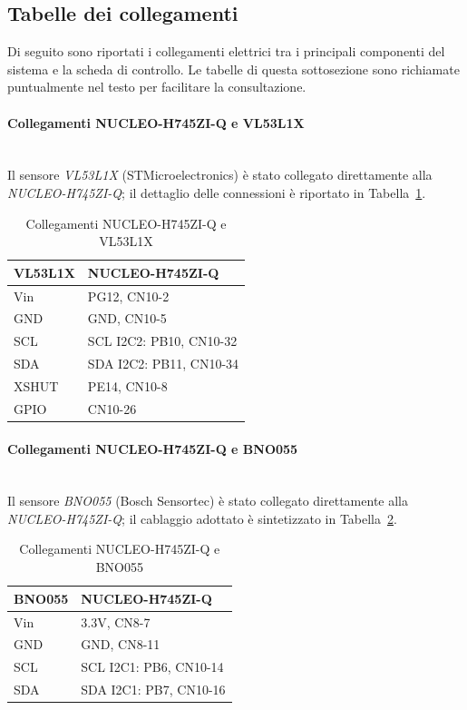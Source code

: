 \documentclass[11pt]{report}
\begin{document}
	\clearpage
	\subsection{Tabelle dei collegamenti}
	Di seguito sono riportati i collegamenti elettrici tra i principali componenti del sistema e la scheda di controllo. Le tabelle di questa sottosezione sono richiamate puntualmente nel testo per facilitare la consultazione.

	\paragraph{Collegamenti NUCLEO-H745ZI-Q e VL53L1X}\mbox{}\\
	Il sensore \textit{VL53L1X} (STMicroelectronics) è stato collegato direttamente alla \textit{NUCLEO-H745ZI-Q}; il dettaglio delle connessioni è riportato in Tabella~\ref{tab:collegamenti-vl53l1x}.
	\begin{table}[H]
		\centering
		\begin{tabular}{l l}
			\toprule
			\textbf{VL53L1X} & \textbf{NUCLEO-H745ZI-Q} \\
			\midrule
			Vin & PG12, CN10-2 \\
			GND & GND, CN10-5 \\
			SCL & SCL I2C2: PB10, CN10-32 \\
			SDA & SDA I2C2: PB11, CN10-34 \\
			XSHUT & PE14, CN10-8 \\
			GPIO & CN10-26 \\
			\bottomrule
		\end{tabular}
		\caption{Collegamenti NUCLEO-H745ZI-Q e VL53L1X}
		\label{tab:collegamenti-vl53l1x}
	\end{table}

	\paragraph{Collegamenti NUCLEO-H745ZI-Q e BNO055}\mbox{}\\
	Il sensore \textit{BNO055} (Bosch Sensortec) è stato collegato direttamente alla \textit{NUCLEO-H745ZI-Q}; il cablaggio adottato è sintetizzato in Tabella~\ref{tab:collegamenti-bno055}.
	\begin{table}[H]
		\centering
		\begin{tabular}{l l}
			\toprule
			\textbf{BNO055} & \textbf{NUCLEO-H745ZI-Q} \\
			\midrule
			Vin & 3.3V, CN8-7 \\
			GND & GND, CN8-11 \\
			SCL & SCL I2C1: PB6, CN10-14 \\
			SDA & SDA I2C1: PB7, CN10-16 \\
			\bottomrule
		\end{tabular}
		\caption{Collegamenti NUCLEO-H745ZI-Q e BNO055}
		\label{tab:collegamenti-bno055}
	\end{table}
\end{document}
